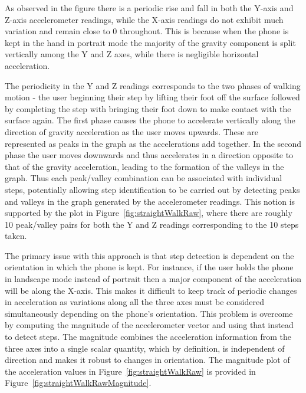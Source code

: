 \documentclass[12pt,a4paper]{report}
\begin{document}
As observed in the figure there is a periodic rise and fall in both the Y-axis and Z-axis accelerometer readings, while the X-axis readings do not exhibit much variation and remain close to 0 throughout. This is because when the phone is kept in the hand in portrait mode the majority of the gravity component is split vertically among the Y and Z axes, while there is negligible horizontal acceleration.

The periodicity in the Y and Z readings corresponds to the two phases of walking motion - the user beginning their step by lifting their foot off the surface followed by completing the step with bringing their foot down to make contact with the surface again. The first phase causes the phone to accelerate vertically along the direction of gravity acceleration as the user moves upwards. These are represented as peaks in the graph as the accelerations add together. In the second phase the user moves downwards and thus accelerates in a direction opposite to that of the gravity acceleration, leading to the formation of the valleys in the graph. Thus each peak/valley combination can be associated with individual steps, potentially allowing step identification to be carried out by detecting peaks and valleys in the graph generated by the accelerometer readings. This notion is supported by the plot in Figure~\ref{fig:straightWalkRaw}, where there are roughly 10 peak/valley pairs for both the Y and Z readings corresponding to the 10 steps taken.   

The primary issue with this approach is that step detection is dependent on the orientation in which the phone is kept. For instance, if the user holds the phone in landscape mode instead of portrait then a major component of the acceleration will  be along the X-axis. This makes it difficult to keep track of periodic changes in acceleration as variations along all the three axes must be considered simultaneously depending on the phone's orientation. This problem is overcome by computing the magnitude of the accelerometer vector and using that instead to detect steps. The magnitude combines the acceleration information from the three axes into a single scalar quantity, which by definition, is independent of direction and makes it robust to changes in orientation. The magnitude plot of the acceleration values in Figure~\ref{fig:straightWalkRaw} is provided in Figure~\ref{fig:straightWalkRawMagnitude}. 
\end{document}

